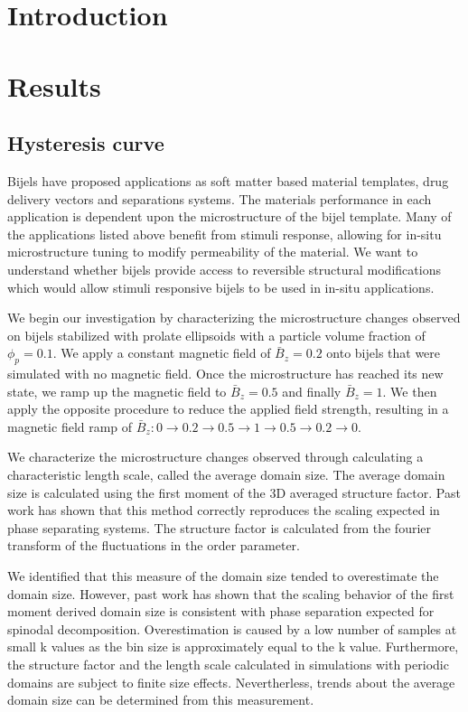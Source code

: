 \section{Introduction}
\section{Results}\label{sec:results_p2}

\subsection{Hysteresis curve}

Bijels have proposed applications as soft matter based material templates, drug delivery vectors and separations systems. 
The materials performance in each application is dependent upon the microstructure of the bijel template. Many of the 
applications listed above benefit from stimuli response, allowing for in-situ microstructure tuning to modify permeability 
of the material. We want to understand whether bijels provide access to reversible structural modifications which would 
allow stimuli responsive bijels to be used in in-situ applications.

We begin our investigation by characterizing the microstructure changes observed on bijels stabilized with prolate 
ellipsoids with a particle volume fraction of $\phi_p = 0.1$. We apply a constant magnetic field of $\bar{B}_z = 0.2$ 
onto bijels that were simulated with no magnetic field. Once the microstructure has reached its new state, we ramp up 
the magnetic field to $\bar{B}_z = 0.5$ and finally $\bar{B}_z = 1$. We then apply the opposite procedure to reduce 
the applied field strength, resulting in a magnetic field ramp of 
$\bar{B}_z: 0 \rightarrow 0.2 \rightarrow 0.5 \rightarrow 1 \rightarrow 0.5 \rightarrow 0.2 \rightarrow 0$.

We characterize the microstructure changes observed through calculating a characteristic length scale, 
called the average domain size. The average domain size is calculated using the first moment of the 3D 
averaged structure factor. Past work has shown that this method correctly reproduces the scaling expected 
in phase separating systems. The structure factor is calculated from the fourier transform of the fluctuations 
in the order parameter. \cite{kendon_inertial_2001}

We identified that this measure of the domain size tended to overestimate the domain size. However, past work has 
shown that the scaling behavior of the first moment derived domain size is consistent with phase separation expected 
for spinodal decomposition. Overestimation is caused by a low number of samples at small k values as the bin size is 
approximately equal to the k value. Furthermore, the structure factor and the length scale calculated in simulations
 with periodic domains are subject to finite size effects. Nevertherless, trends about the average domain size can be 
 determined from this measurement.

